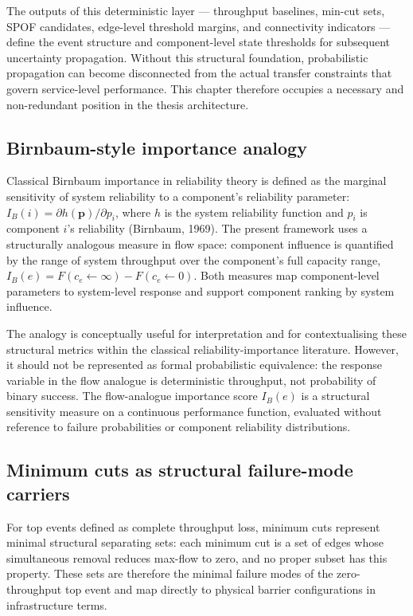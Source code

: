 \documentclass[12pt]{report}
\begin{document}
The outputs of this deterministic layer --- throughput baselines, min-cut sets, SPOF candidates, edge-level threshold margins, and connectivity indicators --- define the event structure and component-level state thresholds for subsequent uncertainty propagation. Without this structural foundation, probabilistic propagation can become disconnected from the actual transfer constraints that govern service-level performance. This chapter therefore occupies a necessary and non-redundant position in the thesis architecture.

\subsection{Birnbaum-style importance analogy}

Classical Birnbaum importance in reliability theory is defined as the marginal sensitivity of system reliability to a component's reliability parameter: $I_B(i) = \partial h(\mathbf{p})/\partial p_i$, where $h$ is the system reliability function and $p_i$ is component $i$'s reliability (Birnbaum, 1969). The present framework uses a structurally analogous measure in flow space: component influence is quantified by the range of system throughput over the component's full capacity range, $I_B(e) = F(c_e\leftarrow\infty) - F(c_e\leftarrow 0)$. Both measures map component-level parameters to system-level response and support component ranking by system influence.

The analogy is conceptually useful for interpretation and for contextualising these structural metrics within the classical reliability-importance literature. However, it should not be represented as formal probabilistic equivalence: the response variable in the flow analogue is deterministic throughput, not probability of binary success. The flow-analogue importance score $I_B(e)$ is a structural sensitivity measure on a continuous performance function, evaluated without reference to failure probabilities or component reliability distributions.

\subsection{Minimum cuts as structural failure-mode carriers}

For top events defined as complete throughput loss, minimum cuts represent minimal structural separating sets: each minimum cut is a set of edges whose simultaneous removal reduces max-flow to zero, and no proper subset has this property. These sets are therefore the minimal failure modes of the zero-throughput top event and map directly to physical barrier configurations in infrastructure terms.
\end{document}
